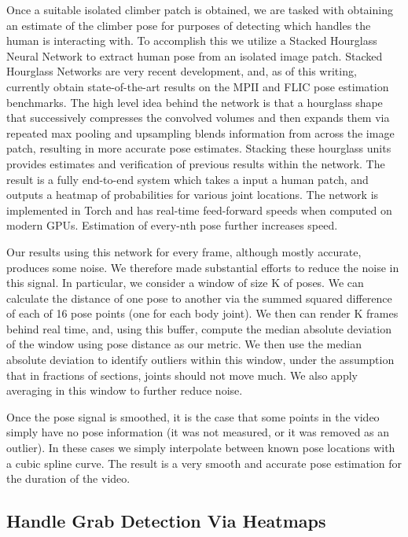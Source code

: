 \documentclass{chi2009}
\begin{document}
Once a suitable isolated climber patch is obtained, we are tasked with obtaining an estimate of the climber pose for purposes of detecting which handles the human is interacting with. To accomplish this we utilize a Stacked Hourglass Neural Network to extract human pose from an isolated image patch. Stacked Hourglass Networks are very recent development, and, as of this writing, currently obtain state-of-the-art results on the MPII and FLIC pose estimation benchmarks. The high level idea behind the network is that a hourglass shape that successively compresses the convolved volumes and then expands them via repeated max pooling and upsampling blends information from across the image patch, resulting in more accurate pose estimates. Stacking these hourglass units provides estimates and verification of previous results within the network. The result is a fully end-to-end system which takes a input a human patch, and outputs a heatmap of probabilities for various joint locations. The network is implemented in Torch and has real-time feed-forward speeds when computed on modern GPUs. Estimation of every-nth pose further increases speed.

Our results using this network for every frame, although mostly accurate, produces some noise. We therefore made substantial efforts to reduce the noise in this signal. In particular, we consider a window of size K of poses. We can calculate the distance of one pose to another via the summed squared difference of each of 16 pose points (one for each body joint). We then can render K frames behind real time, and, using this buffer, compute the median absolute deviation of the window using pose distance as our metric. We then use the median absolute deviation to identify outliers within this window, under the assumption that in fractions of sections, joints should not move much. We also apply averaging in this window to further reduce noise.

Once the pose signal is smoothed, it is the case that some points in the video simply have no pose information (it was not measured, or it was removed as an outlier). In these cases we simply interpolate between known pose locations with a cubic spline curve. The result is a very smooth and accurate pose estimation for the duration of the video.

\subsection{Handle Grab Detection Via Heatmaps}
\end{document}
